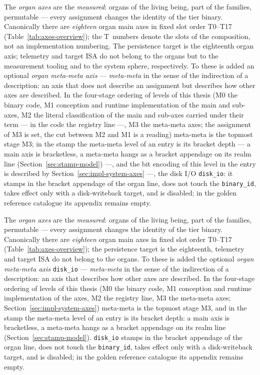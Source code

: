 \begin{nurlang}
The \emph{organ axes} are the \emph{measured}: organs of the living being, part of the families,
permutable --- every assignment changes the identity of the tier binary. Canonically there are
\emph{eighteen} organ main axes in fixed slot order T0--T17
(Table~\ref{tab:axes-overview}); the T~numbers denote the slots of the composition, not an
implementation numbering. The persistence target is the eighteenth organ axis; telemetry and
target ISA do not belong to the organs but to the measurement tooling and to the system sphere, respectively. To these is added
an optional \emph{organ meta-meta axis} --- \emph{meta-meta} in the sense of the indirection of a
description: an axis that does not describe an assignment but describes how other axes are
described. In the four-stage ordering of levels of this thesis (M0 the binary code, M1 conception
and runtime implementation of the main and sub-axes, M2 the literal classification of the main and sub-axes
carried under their term --- in the code the registry line ---, M3 the
meta-meta axes; the assignment of M3 is set, the cut between M2 and M1 is a reading)
meta-meta is the topmost stage M3; in the stamp the meta-meta level of an entry is its bracket depth --- a main axis
is bracketless, a meta-meta hangs as a bracket appendage on its realm line
(Section~\ref{sec:stamp-model}) ---, and the bit encoding of this level in the entry is described by
Section~\ref{sec:impl-system-axes} ---, the disk I/O \texttt{disk\_io}: it stamps in the bracket appendage of the organ line,
does not touch the \texttt{binary\_id}, takes effect only with a disk-writeback target, and is
disabled; in the golden reference catalogue its appendix remains empty.
\end{nurlang}
\begin{nurkurz}
The \emph{organ axes} are the \emph{measured}: organs of the living being, part of the families,
permutable --- every assignment changes the identity of the tier binary. Canonically there are
\emph{eighteen} organ main axes in fixed slot order T0--T17 (Table~\ref{tab:axes-overview}); the
persistence target is the eighteenth, telemetry and target ISA do not belong to the organs. To these is
added the optional \emph{organ meta-meta axis} \texttt{disk\_io} --- \emph{meta-meta} in the sense of the
indirection of a description: an axis that describes how other axes are described. In the four-stage
ordering of levels of this thesis (M0 the binary code, M1 conception and runtime implementation of the
axes, M2 the registry line, M3 the meta-meta axes; Section~\ref{sec:impl-system-axes}) meta-meta is the
topmost stage M3, and in the stamp the meta-meta level of an entry is its bracket depth: a main axis is
bracketless, a meta-meta hangs as a bracket appendage on its realm line
(Section~\ref{sec:stamp-model})\@. \texttt{disk\_io} stamps in the bracket appendage of the organ line,
does not touch the \texttt{binary\_id}, takes effect only with a disk-writeback target, and is disabled;
in the golden reference catalogue its appendix remains empty.
\end{nurkurz}

